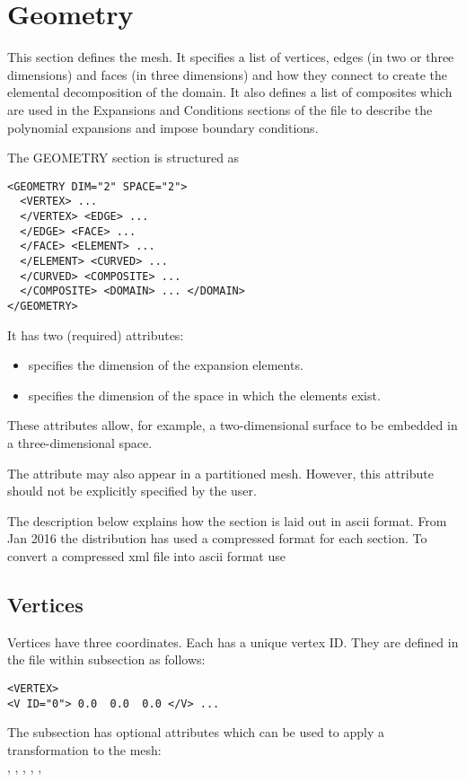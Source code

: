 \section{Geometry}
This section defines the mesh. It specifies a list of vertices, edges (in two or
three dimensions) and faces (in three dimensions) and how they connect to create
the elemental decomposition of the domain. It also defines a list of composites
which are used in the Expansions and Conditions sections of the file to describe
the polynomial expansions and impose boundary conditions.

The GEOMETRY section is structured as \begin{lstlisting}[style=XMLStyle]
<GEOMETRY DIM="2" SPACE="2">
  <VERTEX> ...
  </VERTEX> <EDGE> ...
  </EDGE> <FACE> ...
  </FACE> <ELEMENT> ...
  </ELEMENT> <CURVED> ...
  </CURVED> <COMPOSITE> ...
  </COMPOSITE> <DOMAIN> ... </DOMAIN>
</GEOMETRY>
\end{lstlisting}
It has two (required) attributes:
\begin{itemize}
    \item {} specifies the dimension of the expansion elements.
    \item {} specifies the dimension of the space in which the
    elements exist.
\end{itemize}
These attributes allow, for example, a two-dimensional surface to be embedded in
a three-dimensional space. 

\begin{notebox}
The attribute  may also appear in a partitioned mesh.
However, this attribute should not be explicitly specified by the user.
\end{notebox}

\begin{notebox}
  The description below explains how the  section is laid out in ascii format. From Jan 2016 the distribution has used a compressed format for each section. To convert a compressed xml file into ascii format use \\
\end{notebox}

\subsection{Vertices}

Vertices have three coordinates. Each has a unique vertex ID. They are defined
in the file within  subsection as follows:
\begin{lstlisting}[style=XMLStyle] <VERTEX>
<V ID="0"> 0.0  0.0  0.0 </V> ...
\end{lstlisting}
The  subsection has optional attributes which can be used to
apply a transformation to the mesh:\\
, , , , , 

